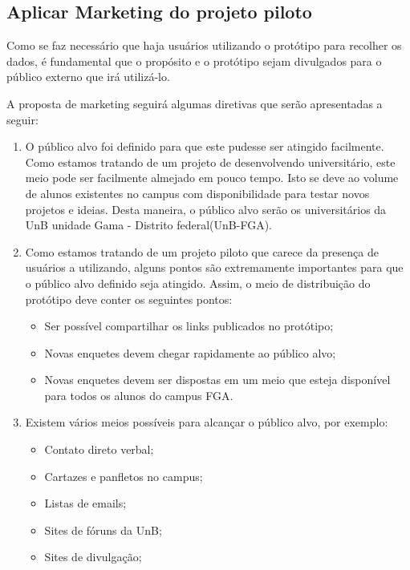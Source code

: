 \subsection{Aplicar Marketing do projeto piloto}
\label{sub:definir_tecnologia}
Como se faz necessário que haja usuários utilizando o protótipo para recolher os dados, é fundamental que o propósito
e o protótipo sejam divulgados para o público externo que irá utilizá-lo. 

A proposta de marketing seguirá algumas diretivas que serão apresentadas a seguir:

\begin{enumerate}
    \item O público alvo foi definido para que este pudesse ser atingido facilmente. Como estamos tratando de um
        projeto de desenvolvendo universitário, este meio pode ser facilmente almejado em pouco tempo. Isto se
        deve ao volume de alunos existentes no campus com disponibilidade para testar novos projetos e ideias.
        Desta maneira, o público alvo serão os universitários da UnB unidade Gama - Distrito federal(UnB-FGA).
    \item Como estamos tratando de um projeto piloto que carece da presença de usuários a utilizando, alguns
        pontos são extremamente importantes para que o público alvo definido seja atingido. Assim, o meio de
        distribuição do protótipo deve conter os seguintes pontos:
        \begin{itemize}
            \item Ser possível compartilhar os links publicados no protótipo;
            \item Novas enquetes devem chegar rapidamente ao público alvo;
            \item Novas enquetes devem ser dispostas em um meio que esteja disponível para todos os
                alunos do campus FGA.
        \end{itemize}
    \item Existem vários meios possíveis para alcançar o público alvo, por exemplo:
        \begin{itemize}
            \item Contato direto verbal;
            \item Cartazes e panfletos no campus;
            \item Listas de emails;
            \item Sites de fóruns da UnB;
            \item Sites de divulgação;

\end{itemize}
\end{enumerate}
